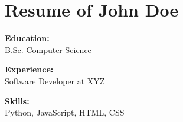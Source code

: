 \documentclass{article}
\begin{document}
    \section*{Resume of John Doe}

    \textbf{Education:} \\
    B.Sc. Computer Science

    \textbf{Experience:} \\
    Software Developer at XYZ

    \textbf{Skills:} \\
    Python, JavaScript, HTML, CSS

    
\end{document}
